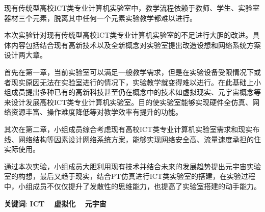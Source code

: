 \documentclass{imutthesis}
\begin{document}
\begin{cnabstract}
    现有传统型高校ICT类专业计算机实验室中，教学流程依赖于教师、学生、实验室器材三个元素，脱离其中任何一个元素实验教学都难以进行。
    
    本次实验针对现有传统型高校ICT类专业计算机实验室的不足进行大胆的改进。具体内容包括结合现有高新技术以及全新概念对实验室提出改造设想和网络系统方案设计两大章。
    
    首先在第一章，当前实验室可以满足一般教学需求，但是在实验设备受限情况下或者现实原因无法在实验室进行的情况下，实验教学就变得难以进行。在此基础上小组成员提出多种已有的高新科技甚至仍在概念中的技术如虚拟现实、元宇宙概念等来设计发展高校ICT类专业计算机实验室。目的使实验室能够实现硬件全仿真、网络资源丰富、操作难度降低等对教学效率有提升的功能。

    其次在第二章，小组成员综合考虑现有高校ICT类专业计算机实验室需求和现实布线、网络结构等因素设计网络系统方案，能够实现网络安全高、流量速度承担的住实际使用。

    通过本次实验，小组成员大胆利用现有技术并结合未来的发展趋势提出元宇宙实验室的构想，最后又趋于现实，结合PT仿真进行ICT类实验室的搭建，在实验过程中，小组成员不仅仅提升了发散性的思维能力，也提高了实验室搭建的动手能力。
    
\par \textbf{关键词}: \textbf{ICT}$\quad$ \textbf{虚拟化}$\quad$ \textbf{元宇宙}    %

\end{cnabstract}
\end{document}
